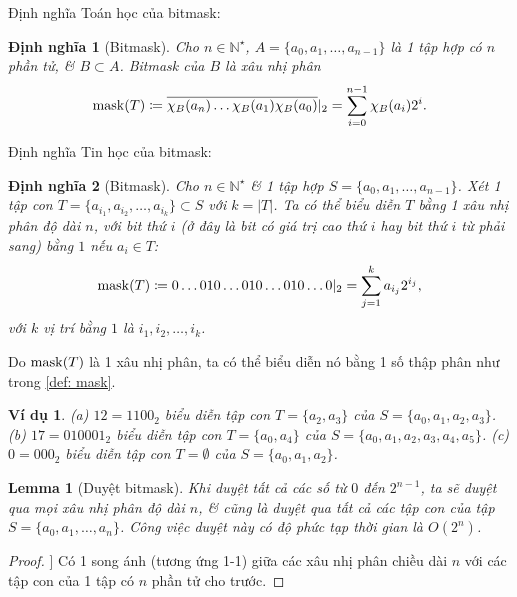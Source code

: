 \documentclass{article}
\newtheorem{dinhnghia}{Định nghĩa}
\newtheorem{lemma}{Lemma}
\newtheorem{vidu}{Ví dụ}
\begin{document}
Định nghĩa Toán học của bitmask:

\begin{dinhnghia}[Bitmask]
    Cho $n\in\mathbb{N}^\star$, $A = \{a_0,a_1,\ldots,a_{n-1}\}$ là 1 tập hợp có $n$ phần tử, \& $B\subset A$. {\rm Bitmask} của $B$ là xâu nhị phân
    \begin{equation*}
        {\rm mask}(T)\coloneqq\overline{\chi_B(a_n)\ldots\chi_B(a_1)\chi_B(a_0)}|_2 = \sum_{i=0}^{n-1} \chi_B(a_i)2^i.
    \end{equation*}
\end{dinhnghia}
Định nghĩa Tin học của bitmask:

\begin{dinhnghia}[Bitmask]
    Cho $n\in\mathbb{N}^\star$ \& 1 tập hợp $S = \{a_0,a_1,\ldots,a_{n-1}\}$. Xét 1 tập con $T = \{a_{i_1},a_{i_2},\ldots,a_{i_k}\}\subset S$ với $k = |T|$. Ta có thể biểu diễn $T$ bằng 1 xâu nhị phân độ dài $n$, với bit thứ $i$ (ở đây là bit có giá trị cao thứ $i$ hay bit thứ $i$ từ phải sang) bằng $1$ nếu $a_i\in T$:
    \begin{equation}
        \label{def: mask}
        {\rm mask}(T)\coloneqq0\ldots010\ldots010\ldots010\ldots0|_2 = \sum_{j=1}^k a_{i_j}2^{i_j},
    \end{equation}
     với $k$ vị trí bằng $1$ là $i_1,i_2,\ldots,i_k$.
\end{dinhnghia}
Do ${\rm mask}(T)$ là 1 xâu nhị phân, ta có thể biểu diễn nó bằng 1 số thập phân như trong \eqref{def: mask}.

\begin{vidu}
    (a) $12 = 1100_2$ biểu diễn tập con $T = \{a_2,a_3\}$ của $S = \{a_0,a_1,a_2,a_3\}$. (b) $17 = 010001_2$ biểu diễn tập con $T = \{a_0,a_4\}$ của $S = \{a_0,a_1,a_2,a_3,a_4,a_5\}$. (c) $0 = 000_2$ biểu diễn tập con $T = \emptyset$ của $S = \{a_0,a_1,a_2\}$.
\end{vidu}

\begin{lemma}[Duyệt bitmask]
    Khi duyệt tất cả các số từ $0$ đến $2^{n-1}$, ta sẽ duyệt qua mọi xâu nhị phân độ dài $n$, \& cũng là duyệt qua tất cả các tập con của tập $S = \{a_0,a_1,\ldots,a_n\}$. Công việc duyệt này có độ phức tạp thời gian là $O(2^n)$.
\end{lemma}

\begin{proof}]
    Có 1 song ánh (tương ứng 1-1) giữa các xâu nhị phân chiều dài $n$ với các tập con của 1 tập có $n$ phần tử cho trước.
\end{proof}
\end{document}
